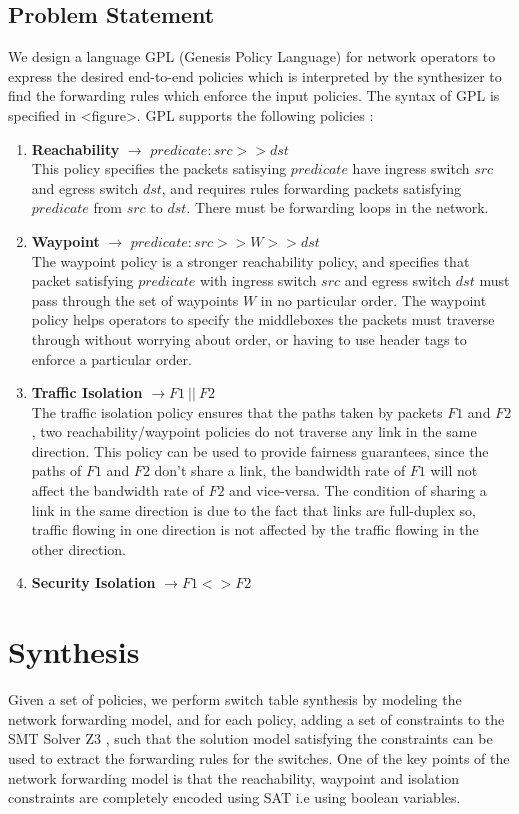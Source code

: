 \documentclass[]{sig}
\begin{document}
\subsection{Problem Statement}
We design a language GPL (Genesis Policy Language) for network operators to express the desired end-to-end policies which is interpreted by the synthesizer to find the forwarding rules which enforce the input policies. The syntax of GPL is specified in <figure>. GPL supports the following policies : 
\begin{enumerate}
	\item \textbf{Reachability} $\rightarrow$ $predicate : src >> dst$ \\
	This policy specifies the packets satisying $predicate$ have ingress switch $src$ and egress switch $dst$, and requires rules forwarding packets satisfying $predicate$ from $src$ to $dst$. There must be forwarding loops in the network. 
	\item \textbf{Waypoint} $\rightarrow$ $predicate : src >> W >> dst$ \\
	The waypoint policy is a stronger reachability policy, and specifies that packet satisfying $predicate$ with ingress switch $src$ and egress switch $dst$ must pass through the set of waypoints $W$ in no particular order. The waypoint policy helps operators to specify the middleboxes the packets must traverse through without worrying about order, or having to use header tags to enforce a particular order. 
	\item \textbf{Traffic Isolation} $\rightarrow F1 \ || \ F2$ \\
	The traffic isolation policy ensures that the paths taken by packets $F1$ and $F2$, two reachability/waypoint policies do not traverse any link in the same direction. This policy can be used to provide fairness guarantees, since the paths of $F1$ and $F2$ don't share a link, the bandwidth rate of $F1$ will not affect the bandwidth rate of $F2$ and vice-versa. The condition of sharing a link in the same direction is due to the fact that links are full-duplex so, traffic flowing in one direction is not affected by the traffic flowing in the other direction.
	\item \textbf{Security Isolation} $\rightarrow F1 <> F2$ 
	 
	
\end{enumerate}

\section{Synthesis}
Given a set of policies, we perform switch table synthesis by modeling the network forwarding model, and for each policy, adding a set of constraints to the SMT Solver Z3 \cite{z3}, such that the solution model satisfying the constraints can be used to extract the forwarding rules for the switches. One of the key points of the network forwarding model is that the reachability, waypoint and isolation constraints are completely encoded using SAT i.e using boolean variables. 
\end{document}
